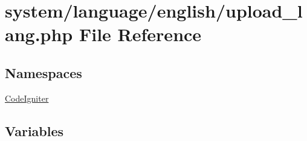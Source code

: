\hypertarget{upload__lang_8php}{}\section{system/language/english/upload\+\_\+lang.php File Reference}
\label{upload__lang_8php}
\subsection*{Namespaces}
\begin{DoxyCompactItemize}
\item 
 \mbox{\hyperlink{namespace_code_igniter}{Code\+Igniter}}
\end{DoxyCompactItemize}
\subsection*{Variables}
